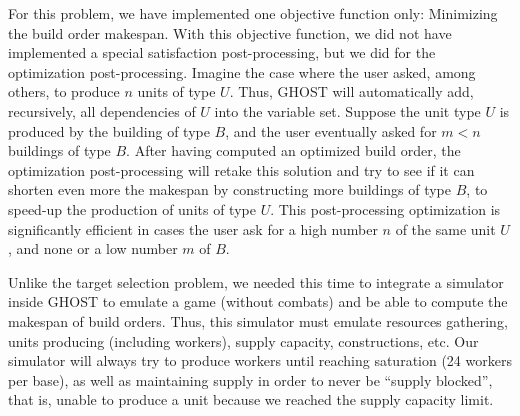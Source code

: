 \documentclass[journal]{IEEEtran}
\newcommand{\ghost}{\textsc{GHOST}\xspace}
\begin{document}
For this  problem, we  have implemented  one objective  function only:
Minimizing the build order makespan.  With this objective function, we
did not  have implemented a special  satisfaction post-processing, but
we did  for the optimization  post-processing. Imagine the  case where
the user asked, among others, to  produce $n$ units of type $U$. Thus,
\ghost will  automatically add,  recursively, all dependencies  of $U$
into the variable  set.  Suppose the unit type $U$  is produced by the
building  of type  $B$, and  the  user eventually  asked for  $m <  n$
buildings  of type  $B$.   After having  computed  an optimized  build
order, the optimization post-processing  will retake this solution and
try to  see if it can  shorten even more the  makespan by constructing
more buildings  of type $B$,  to speed-up  the production of  units of
type   $U$.   This   post-processing  optimization   is  significantly
efficient in cases the user ask for a high number $n$ of the same unit
$U$, and none or a low number $m$ of $B$.

Unlike the target selection problem,  we needed this time to integrate
a simulator inside  \ghost to emulate a game (without  combats) and be
able to  compute the  makespan of build  orders. Thus,  this simulator
must emulate resources gathering, units producing (including workers),
supply capacity, constructions, etc.  Our simulator will always try to
produce workers  until reaching saturation  (24 workers per  base), as
well as  maintaining supply in  order to never be  ``supply blocked'',
that  is, unable  to  produce a  unit because  we  reached the  supply
capacity limit.
\end{document}
